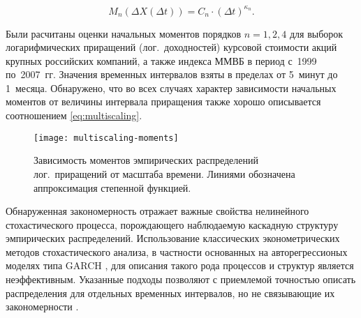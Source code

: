\documentclass{mce-article}
\begin{document}
\begin{equation}
  \label{eq:multiscaling}
  M_n(\Delta X(\Delta t)) = C_n \cdot (\Delta t)^{\kappa_n}.
\end{equation}

Были расчитаны оценки начальных моментов порядков $n = 1, 2, 4$ для
выборок логарифмических приращений (лог.~доходностей) курсовой
стоимости акций крупных российских компаний, а также индекса ММВБ в
период с~1999 по~2007~гг. Значения временных интервалов взяты в
пределах от 5~минут до 1~месяца. Обнаружено, что во всех случаях
характер зависимости начальных моментов от величины интервала
приращения также хорошо описывается соотношением
\eqref{eq:multiscaling}.

\begin{figure}
  \centering
  \texttt{[image: multiscaling-moments]}
  \caption{Зависимость моментов эмпирических распределений
    лог.~приращений от масштаба времени. Линиями обозначена
    аппроксимация степенной функцией.}
\end{figure}


Обнаруженная закономерность отражает важные свойства нелинейного
стохастического процесса, порождающего наблюдаемую каскадную структуру
эмпирических распределений. Использование классических
эконометрических методов стохастического анализа, в частности
основанных на авторегрессионых моделях типа GARCH \cite{Bollerslev},
для описания такого рода процессов и структур является
неэффективным. Указанные подходы позволяют с приемлемой точностью
описать распределения для отдельных временных интервалов, но не
связывающие их закономерности \cite{Brummelhuis}.
\end{document}
